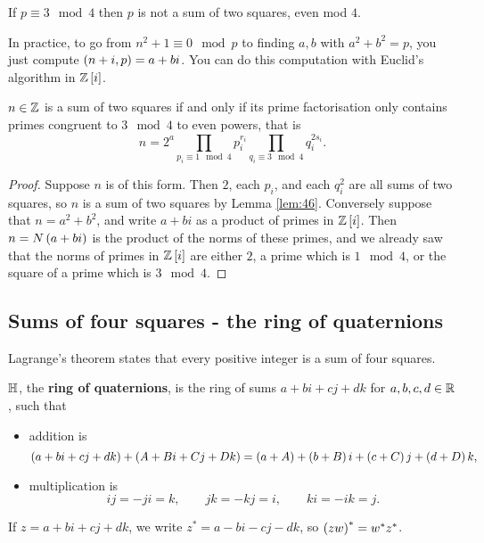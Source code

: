 \begin{remark*}
If $ p \equiv 3 \mod 4 $ then $ p $ is not a sum of two squares, even mod $ 4 $.
\end{remark*}

\begin{remark*}
In practice, to go from $ n^2 + 1 \equiv 0 \mod p $ to finding $ a, b $ with $ a^2 + b^2 = p $, you just compute $ \left( n + i, p \right) = a + bi $. You can do this computation with Euclid's algorithm in $ \mathbb{Z}\left[ i \right] $.
\end{remark*}

\begin{theorem}
$ n \in \mathbb{Z} $ is a sum of two squares if and only if its prime factorisation only contains primes congruent to $ 3 \mod 4 $ to even powers, that is
$$ n = 2^a\prod_{p_i \equiv 1 \mod 4} p_i^{r_i}\prod_{q_i \equiv 3 \mod 4} q_i^{2s_i}. $$
\end{theorem}

\begin{proof}
Suppose $ n $ is of this form. Then $ 2 $, each $ p_i $, and each $ q_i^2 $ are all sums of two squares, so $ n $ is a sum of two squares by Lemma \ref{lem:46}. Conversely suppose that $ n = a^2 + b^2 $, and write $ a + bi $ as a product of primes in $ \mathbb{Z}\left[ i \right] $. Then $ n = N\left( a + bi \right) $ is the product of the norms of these primes, and we already saw that the norms of primes in $ \mathbb{Z}\left[ i \right] $ are either $ 2 $, a prime which is $ 1 \mod 4 $, or the square of a prime which is $ 3 \mod 4 $.
\end{proof}

\subsection{Sums of four squares - the ring of quaternions}

Lagrange's theorem states that every positive integer is a sum of four squares.

\begin{definition}
$ \mathbb{H} $, the \textbf{ring of quaternions}, is the ring of sums $ a + bi + cj + dk $ for $ a, b, c, d \in \mathbb{R} $, such that
\begin{itemize}
\item addition is
$$ \left( a + bi + cj + dk \right) + \left( A + Bi + Cj + Dk \right) = \left( a + A \right) + \left( b + B \right)i + \left( c + C \right)j + \left( d + D \right)k, $$
\item multiplication is
$$ ij = -ji = k, \qquad jk = -kj = i, \qquad ki = -ik = j. $$
\end{itemize}
If $ z = a + bi + cj + dk $, we write $ z^* = a - bi - cj - dk $, so $ \left( zw \right)^* = w^*z^* $.
\end{definition}


